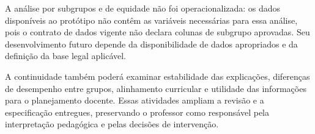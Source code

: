 A análise por subgrupos e de equidade não foi operacionalizada: os dados disponíveis ao protótipo não contêm as variáveis necessárias para essa análise, pois o contrato de dados vigente não declara colunas de subgrupo aprovadas. Seu desenvolvimento futuro depende da disponibilidade de dados apropriados e da definição da base legal aplicável.

A continuidade também poderá examinar estabilidade das explicações, diferenças de desempenho entre grupos, alinhamento curricular e utilidade das informações para o planejamento docente. Essas atividades ampliam a revisão e a especificação entregues, preservando o professor como responsável pela interpretação pedagógica e pelas decisões de intervenção.

